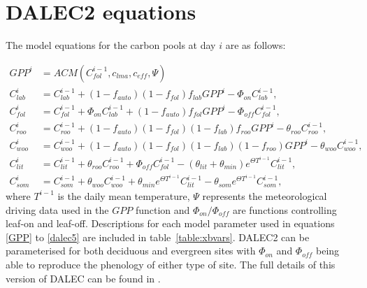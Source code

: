 \documentclass[12pt]{article}
\begin{document}
{}

\appendix

\section{DALEC2 equations} \label{sec:dalec_eqns}

The model equations for the carbon pools at day $i$ are as follows:

\begin{align}
GPP^{i} &= ACM(C_{fol}^{i-1}, c_{lma}, c_{eff}, \Psi) \label{GPP}
\\C_{lab}^{i}&=C_{lab}^{i-1}+(1-f_{auto})(1-f_{fol})f_{lab}GPP^{i}-\Phi _{on}C_{lab}^{i-1}, \label{daleclab}
\\C_{fol}^{i}&=C_{fol}^{i-1}+\Phi_{on}C_{lab}^{i-1}+(1-f_{auto})f_{fol}GPP^{i}-\Phi_{off}C_{fol}^{i-1}, \label{dalec1}
\\C_{roo}^{i}&=C_{roo}^{i-1}+(1-f_{auto})(1-f_{fol})(1-f_{lab})f_{roo}GPP^{i}-\theta_{roo}C_{roo}^{i-1}, 
\\C_{woo}^{i}&=C_{woo}^{i-1}+(1-f_{auto})(1-f_{fol})(1-f_{lab})(1-f_{roo})GPP^{i}-\theta_{woo}C_{woo}^{i-1}, 
\\C_{lit}^{i}&=C_{lit}^{i-1}+\theta_{roo}C_{roo}^{i-1}+\Phi_{off}C_{fol}^{i-1}-(\theta_{lit}+\theta_{min})e^{\Theta T^{i-1}}C_{lit}^{i-1}, 
\\C_{som}^{i}&=C_{som}^{i-1}+\theta_{woo}C_{woo}^{i-1}+\theta_{min}e^{\Theta T^{i-1}}C_{lit}^{i-1}-\theta_{som}e^{\Theta T^{i-1}}C_{som}^{i-1}, \label{dalec5}
\end{align}
where $T^{i-1}$ is the daily mean temperature, $\Psi$ represents the meteorological driving data used in the $GPP$ function and $\Phi_{on} / \Phi_{off}$ are functions controlling leaf-on and leaf-off. Descriptions for each model parameter used in equations \eqref{GPP} to \eqref{dalec5} are included in table~\ref{table:xbvars}. DALEC2 can be parameterised for both deciduous and evergreen sites with $\Phi_{on}$ and $\Phi_{off}$ being able to reproduce the phenology of either type of site. The full details of this version of DALEC can be found in \cite{Bloom2015}. 
\end{document}
